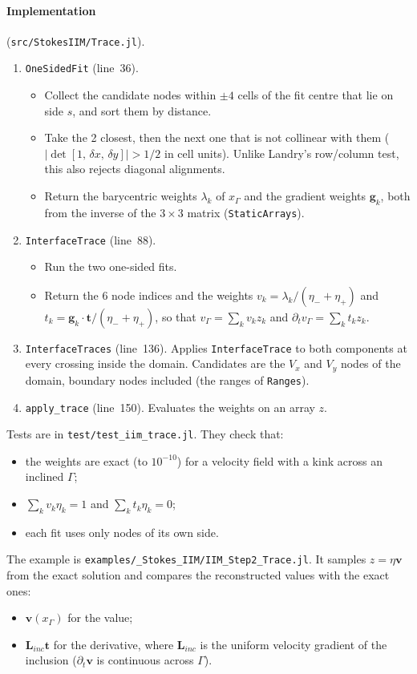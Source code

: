 \documentclass[11pt,a4paper]{article}
\newcommand{\code}[1]{\texttt{#1}}
\begin{document}
\paragraph{Implementation} (\code{src/StokesIIM/Trace.jl}).
\begin{enumerate}[leftmargin=*]
\item \code{OneSidedFit} (line~36).
  \begin{itemize}
    \item Collect the candidate nodes within $\pm4$ cells of the fit centre that lie on side
      $s$, and sort them by distance.
    \item Take the 2 closest, then the next one that is not collinear with them
      ($|\det[1,\,\delta x,\,\delta y]|>1/2$ in cell units). Unlike Landry's row/column test,
      this also rejects diagonal alignments.
    \item Return the barycentric weights $\lambda_k$ of $x_\Gamma$ and the gradient weights
      $\mathbf g_k$, both from the inverse of the $3\times3$ matrix (\code{StaticArrays}).
  \end{itemize}
\item \code{InterfaceTrace} (line~88).
  \begin{itemize}
    \item Run the two one-sided fits.
    \item Return the 6 node indices and the weights $v_k=\lambda_k/(\eta_-+\eta_+)$ and
      $t_k=\mathbf g_k\cdot\mathbf t/(\eta_-+\eta_+)$, so that
      $v_\Gamma=\sum_k v_kz_k$ and $\partial_tv_\Gamma=\sum_k t_kz_k$.
  \end{itemize}
\item \code{InterfaceTraces} (line~136). Applies \code{InterfaceTrace} to both components at
  every crossing inside the domain. Candidates are the $V_x$ and $V_y$ nodes of the domain,
  boundary nodes included (the ranges of \code{Ranges}).
\item \code{apply\_trace} (line~150). Evaluates the weights on an array $z$.
\end{enumerate}

\noindent Tests are in \code{test/test\_iim\_trace.jl}. They check that:
\begin{itemize}
  \item the weights are exact (to $10^{-10}$) for a velocity field with a kink across an
    inclined $\Gamma$;
  \item $\sum_k v_k\eta_k=1$ and $\sum_k t_k\eta_k=0$;
  \item each fit uses only nodes of its own side.
\end{itemize}
The example is \code{examples/\_Stokes\_IIM/IIM\_Step2\_Trace.jl}. It samples
$z=\eta\mathbf v$ from the exact solution and compares the reconstructed values with the exact
ones:
\begin{itemize}
  \item $\mathbf v(x_\Gamma)$ for the value;
  \item $\mathbf L_{inc}\mathbf t$ for the derivative, where $\mathbf L_{inc}$ is the uniform
    velocity gradient of the inclusion ($\partial_t\mathbf v$ is continuous across $\Gamma$).
\end{itemize}
\end{document}
